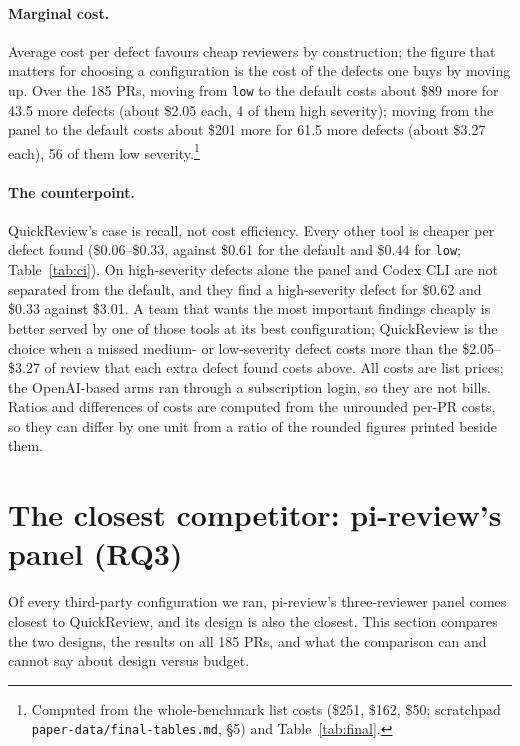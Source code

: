\documentclass[11pt,a4paper]{article}
\newcommand{\qcr}{QuickReview}
\newcommand{\code}[1]{\texttt{#1}}
\begin{document}
\paragraph{Marginal cost.} Average cost per defect favours cheap reviewers
by construction; the figure that matters for choosing a configuration is the
cost of the defects one buys by moving up. Over the 185 PRs, moving from
\code{low} to the default costs about \$89 more for 43.5 more defects (about
\$2.05 each, 4 of them high severity); moving from the panel to the default
costs about \$201 more for 61.5 more defects (about \$3.27 each), 56 of them
low severity.\footnote{Computed from the whole-benchmark list costs (\$251,
\$162, \$50; scratchpad \code{paper-data/final-tables.md}, \S5) and
Table~\ref{tab:final}.}

\paragraph{The counterpoint.} \qcr{}'s case is recall, not cost efficiency.
Every other tool is cheaper per defect found (\$0.06--\$0.33, against \$0.61
for the default and \$0.44 for \code{low}; Table~\ref{tab:ci}). On
high-severity defects alone the panel and Codex CLI are not separated from
the default, and they find a high-severity defect for \$0.62 and \$0.33
against \$3.01. A team that wants the most important findings cheaply is
better served by one of those tools at its best configuration; \qcr{} is the
choice when a missed medium- or low-severity defect costs more than the
\$2.05--\$3.27 of review that each extra defect found costs above. All costs are list prices; the OpenAI-based arms ran
through a subscription login, so they are not bills. Ratios and differences
of costs are computed from the unrounded per-PR costs, so they can differ by
one unit from a ratio of the rounded figures printed beside them.

\section{The closest competitor: pi-review's panel (RQ3)}
\label{sec:panel}

Of every third-party configuration we ran, pi-review's three-reviewer panel
comes closest to \qcr{}, and its design is also the closest. This section
compares the two designs, the results on all 185 PRs, and what the
comparison can and cannot say about design versus budget.
\end{document}
